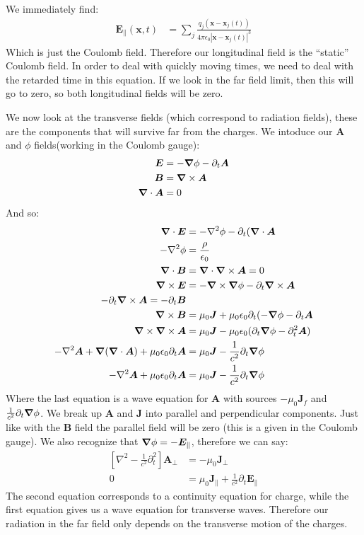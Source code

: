 We immediately find:
\begin{align*}
	\bm{E}_\parallel(\bm{x},t) &= \sum_j \frac{q_j (\bm{x} - \bm{x}_j(t))}{4\pi\epsilon_0 |\bm{x} - \bm{x}_j(t)|^3}
\end{align*}
Which is just the Coulomb field. Therefore our longitudinal field is the ``static'' Coulomb field. In order to deal with quickly moving times, we need to deal with the retarded time in this equation.
If we look in the far field limit, then this will go to zero, so both longitudinal fields will be zero.

We now look at the transverse fields (which correspond to radiation fields), these are the components that will survive far from the charges. We intoduce our $\bm{A}$ and $\phi$ fields(working in the Coulomb gauge):
\begin{align*}
	\bm{E} &= -\bm{\nabla}\phi -\partial_t\bm{A} \\
	\bm{B} &= \bm{\nabla}\times\bm{A} \\
	\bm{\nabla}\cdot\bm{A} &= 0\\
\end{align*}
And so:
\begin{align*}
	\bm{\nabla}\cdot\bm{E} &= -\nabla^2\phi -\partial_t (\bm{\nabla}\cdot\bm{A} \\
	-\nabla^2\phi &= \frac{\rho}{\epsilon_0} \\
	\bm{\nabla}\cdot\bm{B} &= \bm{\nabla}\cdot\bm{\nabla}\times\bm{A} = 0 \\
	\bm{\nabla}\times\bm{E} &= -\bm{\nabla}\times\bm{\nabla}\phi - \partial_t \bm{\nabla}\times\bm{A} \\
	- \partial_t \bm{\nabla}\times\bm{A} = -\partial_t \bm{B} \\
	\bm{\nabla}\times\bm{B} &= \mu_0\bm{J} + \mu_0\epsilon_0\partial_t(-\bm{\nabla}\phi -\partial_t\bm{A} \\
	\bm{\nabla}\times\bm{\nabla}\times\bm{A} &= \mu_0\bm{J} -\mu_0\epsilon_0 (\partial_t \bm{\nabla}\phi - \partial_t^2 \bm{A}) \\
	-\nabla^2\bm{A} + \bm{\nabla}(\bm{\nabla}\cdot\bm{A}) + \mu_0\epsilon_0\partial_t \bm{A} &= \mu_0\bm{J} -\frac{1}{c^2}\partial_t \bm{\nabla}\phi \\
	-\nabla^2\bm{A} + \mu_0\epsilon_0\partial_t \bm{A} &= \mu_0\bm{J} -\frac{1}{c^2}\partial_t \bm{\nabla}\phi
\end{align*}
Where the last equation is a wave equation for $\bm{A}$ with sources $-\mu_0\bm{J}_f$ and $\frac{1}{c^2}\partial_t\bm{\nabla}\phi$. We break up $\bm{A}$ and $\bm{J}$ into parallel and perpendicular components.
Just like with the $\bm{B}$ field the parallel field will be zero (this is a given in the Coulomb gauge). We also recognize that $\bm{\nabla}\phi = -\bm{E}_\parallel$, therefore we can say:
\begin{align*}
	\left[\nabla^2 - \frac{1}{c^2}\partial_t^2\right] \bm{A}_\perp &= -\mu_0\bm{J}_\perp \\
	0 &= \mu_0\bm{J}_\parallel + \frac{1}{c^2} \partial_t\bm{E}_\parallel
\end{align*}
The second equation corresponds to a continuity equation for charge, while the first equation gives us a wave equation for transverse waves. Therefore our radiation in the far field only depends on the transverse motion of the charges.


